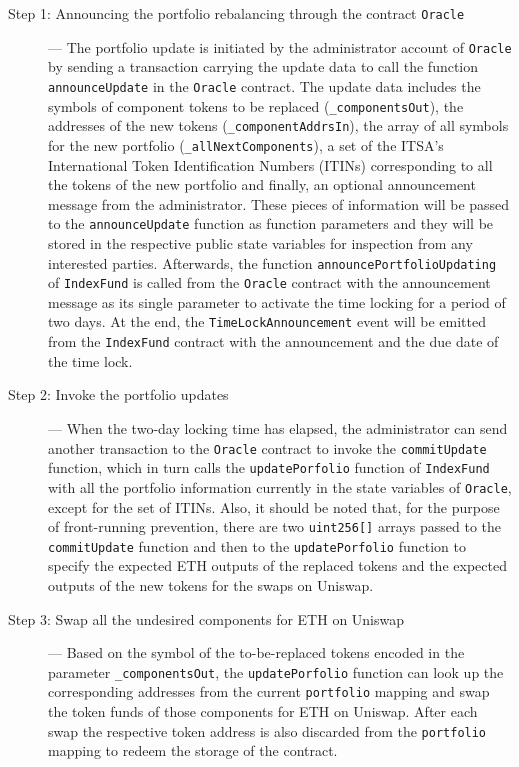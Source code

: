 \begin{description}
  \item[Step 1: Announcing the portfolio rebalancing through the contract \texttt{Oracle}] --- The portfolio update is initiated by the administrator account of \texttt{Oracle} by sending a transaction carrying the update data to call the function \texttt{announceUpdate} in the \texttt{Oracle} contract. The update data includes the symbols of component tokens to be replaced (\texttt{\_componentsOut}), the addresses of the new tokens (\texttt{\_componentAddrsIn}), the array of all symbols for the new portfolio (\texttt{\_allNextComponents}), a set of the ITSA's International Token Identification Numbers (ITINs) corresponding to all the tokens of the new portfolio and finally, an optional announcement message from the administrator. These pieces of information will be passed to the \texttt{announceUpdate} function as function parameters and they will be stored in the respective public state variables for inspection from any interested parties. Afterwards, the function \texttt{announcePortfolioUpdating} of \texttt{IndexFund} is called from the \texttt{Oracle} contract with the announcement message as its single parameter to activate the time locking for a period of two days. At the end, the \texttt{TimeLockAnnouncement} event will be emitted from the \texttt{IndexFund} contract with the announcement and the due date of the time lock.
  
  \item[Step 2: Invoke the portfolio updates] --- When the two-day locking time has elapsed, the administrator can send another transaction to the  \texttt{Oracle} contract to invoke the \texttt{commitUpdate} function, which in turn calls the \texttt{updatePorfolio} function of \texttt{IndexFund} with all the portfolio information currently in the state variables of \texttt{Oracle}, except for the set of ITINs. Also, it should be noted that, for the purpose of front-running prevention, there are two \texttt{uint256[]} arrays passed to the \texttt{commitUpdate} function and then to the \texttt{updatePorfolio} function to specify the expected ETH outputs of the replaced tokens and the expected outputs of the new tokens for the swaps on Uniswap.
  
  \item[Step 3: Swap all the undesired components for ETH on Uniswap] ---  Based on the symbol of the to-be-replaced tokens encoded in the parameter \texttt{\_componentsOut}, the \texttt{updatePorfolio} function can look up the corresponding addresses from the current \texttt{portfolio} mapping and swap the token funds of those components for ETH on Uniswap. After each swap the respective token address is also discarded from the \texttt{portfolio} mapping to redeem the storage of the contract.
  

\end{description}
